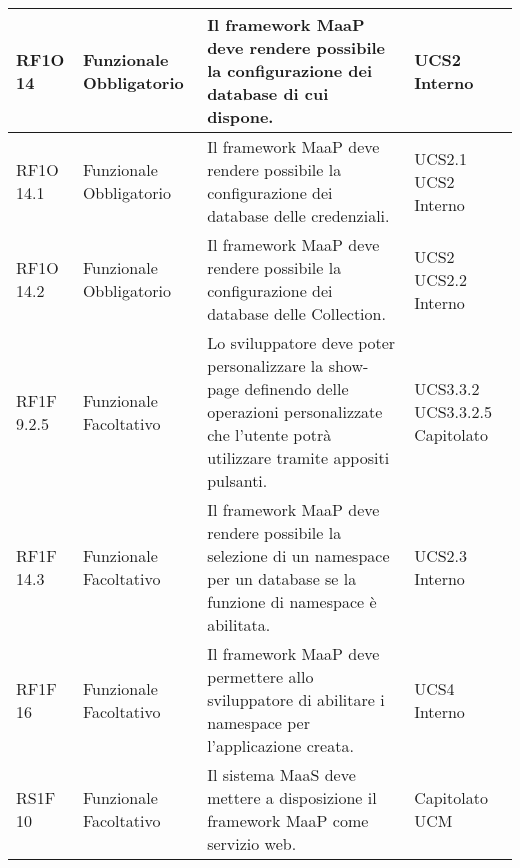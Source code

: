 \begin{center}
\begin{longtable}{ | l | p{2cm} | p{5cm} | p{1.7cm} |}
        RF1O 14 & Funzionale \newline  Obbligatorio  & Il framework MaaP deve rendere possibile la configurazione dei database di cui dispone. &  UCS2 \newline  Interno \newline  \\ \hline      
        RF1O 14.1 & Funzionale \newline  Obbligatorio  & Il framework MaaP deve rendere possibile la configurazione dei database delle credenziali. &  UCS2.1 \newline  UCS2 \newline  Interno \newline  \\ \hline      
        RF1O 14.2 & Funzionale \newline  Obbligatorio  & Il framework MaaP deve rendere possibile la configurazione dei database delle Collection. &  UCS2 \newline  UCS2.2 \newline  Interno \newline  \\ \hline      
        RF1F 9.2.5 & Funzionale \newline  Facoltativo  & Lo sviluppatore deve poter personalizzare la show-page definendo delle operazioni personalizzate che l'utente potrà utilizzare tramite appositi pulsanti. &  UCS3.3.2 \newline  UCS3.3.2.5 \newline  Capitolato \newline  \\ \hline      
        RF1F 14.3 & Funzionale \newline  Facoltativo  & Il framework MaaP deve rendere possibile la selezione di un namespace per un database se la funzione di namespace è abilitata. &  UCS2.3 \newline  Interno \newline  \\ \hline      
        RF1F 16 & Funzionale \newline  Facoltativo  & Il framework MaaP deve permettere allo sviluppatore di abilitare i namespace per l'applicazione creata. &  UCS4 \newline  Interno \newline  \\ \hline      
        RS1F 10 & Funzionale \newline  Facoltativo  & Il sistema MaaS deve mettere a disposizione il framework MaaP come servizio web. &  Capitolato \newline  UCM \newline  \\ \hline      

\end{longtable}
\end{center}
